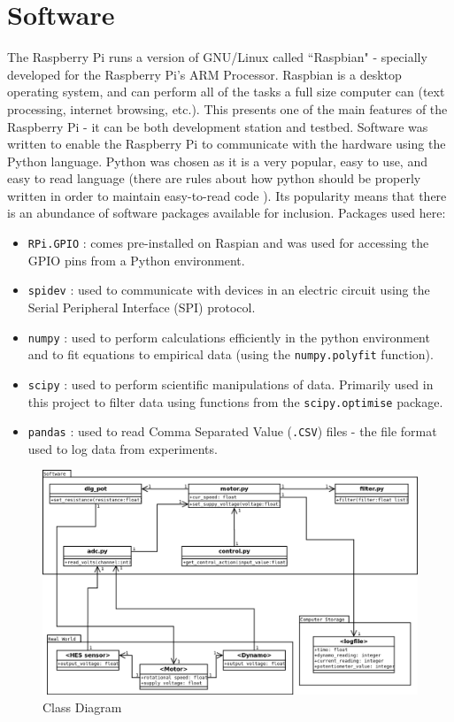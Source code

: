 \documentclass[twoside,a4]{report}
\def\br{\newline \newline \noindent}
\begin{document}
	\section{Software}
	The Raspberry Pi runs a version of GNU/Linux called ``Raspbian" - specially developed for the Raspberry Pi's ARM Processor. Raspbian is a desktop operating system, and can perform all of the tasks a full size computer can (text processing, internet browsing, etc.). This presents one of the main features of the Raspberry Pi - it can be both development station and testbed. Software was written to enable the Raspberry Pi to communicate with the hardware using the Python language. Python was chosen as it is a very popular, easy to use, and easy to read language (there are rules about how python should be properly written in order to maintain easy-to-read code \cite{pep8ref}). Its popularity means that there is an abundance of software packages available for inclusion. 
	\br
	Packages used here:
	\begin{itemize}
		\item \texttt{RPi.GPIO} \cite{citerpigpio}: comes pre-installed on Raspian and was used for accessing the GPIO pins from a Python environment.
		\item \texttt{spidev} \cite{srcspidev}: used to communicate with devices in an electric circuit using the Serial Peripheral Interface (SPI) protocol.
		\item \texttt{numpy} \cite{numpyref}: used to perform calculations efficiently in the python environment and to fit equations to empirical data (using the \texttt{numpy.polyfit} function).
		\item \texttt{scipy} \cite{scipyref}: used to perform scientific manipulations of data. Primarily used in this project to filter data using functions from the \texttt{scipy.optimise} package.
		\item \texttt{pandas} \cite{pandasref}: used to read Comma Separated Value (\texttt{.CSV}) files - the file format used to log data from experiments.
	\end{itemize}
	
	\begin{figure}[!htb]
		\centering
		\includegraphics[scale=0.35]{images/codemap.png}
		\caption{Class Diagram}
		\label{figcladia}
	\end{figure}
	
\end{document}
